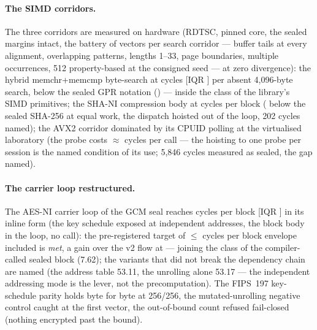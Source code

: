 \documentclass[11pt,a4paper]{article}
\begin{document}
\paragraph{The SIMD corridors.} The three corridors are measured on
hardware (RDTSC, pinned core, the sealed margins intact, the battery
of \batterieVecteurs{} vectors per search corridor --- buffer tails at
every alignment, overlapping patterns, lengths 1--33, page
boundaries, multiple occurrences, 512 property-based at the consigned
seed --- at zero divergence): the hybrid memchr+memcmp byte-search at
\hybrideCycles{} cycles [IQR \hybrideIqr{}] per absent 4{,}096-byte
search, \hybrideGain{} below the sealed GPR notation (\scelleGprCycles{})
--- inside the class of the library's SIMD primitives; the SHA-NI
compression body at \shaniCorpsCbloc{} cycles per block (\shaniGain{}
below the sealed SHA-256 at equal work, the dispatch hoisted out of
the loop, 202 cycles named); the AVX2 corridor dominated by its
CPUID polling at the virtualised laboratory (the probe costs
$\approx$\cpuidSondage{} cycles per call --- the hoisting to one probe
per session is the named condition of its use; 5{,}846 cycles measured
as sealed, the gap named).

\paragraph{The carrier loop restructured.} The AES-NI carrier loop
of the GCM seal reaches \porteuseVquatreInline{} cycles per block [IQR
\porteuseVquatreIqr{}] in its inline form (the key schedule exposed
at independent addresses, the block body in the loop, no call): the
pre-registered target of $\le$\porteuseCible{} cycles per block
envelope included is \emph{met}, a \porteuseGain{} gain over the v2
flow at \porteuseVdeuxFlux{} --- joining the class of the compiler-called sealed block (7.62); the variants that did not break
the dependency chain are named (the address table 53.11, the unrolling alone 53.17 --- the independent addressing mode is the
lever, not the precomputation). The FIPS~197 key-schedule parity
holds byte for byte at 256/256, the mutated-unrolling negative
control caught at the first vector, the out-of-bound count refused
fail-closed (nothing encrypted past the bound).
\end{document}
